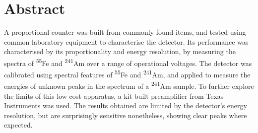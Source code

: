 \chapter*{Abstract}

A proportional counter was built from commonly found items, and tested using common laboratory equipment to characterise the detector. Its performance was characterised by its proportionality and energy resolution, by measuring the spectra of \textsuperscript{55}Fe and \textsuperscript{241}Am over a range of operational voltages. The detector was calibrated using spectral features of \textsuperscript{55}Fe and \textsuperscript{241}Am, and applied to measure the energies of unknown peaks in the spectrum of a \textsuperscript{241}Am sample. To further explore the limits of this low cost apparatus, a kit built preamplifier from Texas Instruments was used. The results obtained are limited by the detector's energy resolution, but are surprisingly sensitive nonetheless, showing clear peaks where expected.